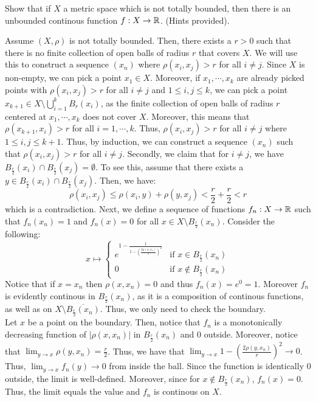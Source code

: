 \documentclass[12pt]{article}
\begin{document}
\begin{problem}{6} 
    Show that if $X$ a metric space which is not totally bounded, then there is an unbounded continous function $f: X \to \mathbb R$. (Hints provided).
\end{problem}

\begin{solution}
    Assume $(X, \rho)$ is not totally bounded. Then, there exists a $r > 0$ such that there is no finite collection of open balls of radius $r$ that covers $X$. We will use this to construct a sequence $(x_n)$ where $\rho(x_i, x_j) > r$ for all $i \neq j$. \bbni
    Since $X$ is non-empty, we can pick a point $x_1 \in X$. Moreover, if $x_1, \cdots, x_k$ are already picked points with $\rho(x_i, x_j) > r$ for all $i \neq j$ and $1 \leq i,j \leq k$, we can pick a point $x_{k+1} \in X \setminus \bigcup_{i=1}^k B_r(x_i)$, as the finite collection of open balls of radius $r$ centered at $x_1, \cdots, x_k$ does not cover $X$. Moreover, this means that $\rho(x_{k+1}, x_i) > r$ for all $i = 1, \cdots, k$. Thus, $\rho(x_i, x_j) > r$ for all $i\neq j$ where $1 \leq i, j \leq k+1$. Thus, by induction, we can construct a sequence $(x_n)$ such that $\rho(x_i, x_j) > r$ for all $i \neq j$. \bbni
    Secondly, we claim that for $i \neq j$, we have $B_{\frac r2}(x_i) \cap B_{\frac r2}(x_j) = \emptyset$. To see this, assume that there exists a $y \in B_{\frac r2}(x_i) \cap B_{\frac r2}(x_j)$. Then, we have:
    \[ \rho(x_i, x_j) \leq \rho(x_i, y) + \rho(y, x_j) < \frac r2 + \frac r2 < r\]
    which is a contradiction. \bbni
    Next, we define a sequence of functions $f_n: X \to \mathbb R$ such that $f_n(x_n) = 1$ and $f_n(x) = 0$ for all $x \in X \setminus B_{\frac r2}(x_n)$. Consider the following: 
    \[ x \mapsto \begin{cases}
        e^{1-\frac{1}{1-\left(\frac{2\rho(x,x_n)}{r}\right)^2}} & \text{if } x \in B_{\frac r2}(x_n) \\
        0 & \text{if } x \not \in B_{\frac r2}(x_n)
    \end{cases}\]
    Notice that if $x = x_n$ then $\rho(x, x_n) = 0$ and thus $f_n(x) = e^0 = 1$. Moreover $f_n$ is evidently continous in $B_{\frac r2}(x_n)$, as it is a composition of continous functions, as well as on $X \setminus \overline{B_{\frac r2}(x_n)}$. Thus, we only need to check the boundary. \\
    Let $x$ be a point on the boundary. Then, notice that $f_n$ is a monotonically decreasing function of $|\rho(x, x_n)|$ in $B_{\frac r2}(x_n)$ and $0$ outside. Moreover, notice that $\lim_{y \to x} \rho(y,x_n) = \frac r2$. Thus, we have that $\lim_{y\to x} 1-\left(\frac{2\rho(y,x_n)}{r}\right)^2 \to 0$. Thus, $\lim_{y\to x} f_n(y) \to 0$ from inside the ball. Since the function is identically $0$ outside, the limit is well-defined. Moreover, since for $x \not \in B_{\frac r2}(x_n)$, $f_n(x) = 0$. Thus, the limit equals the value and $f_n$ is continous on $X$. \bbni

\end{solution}
\end{document}
